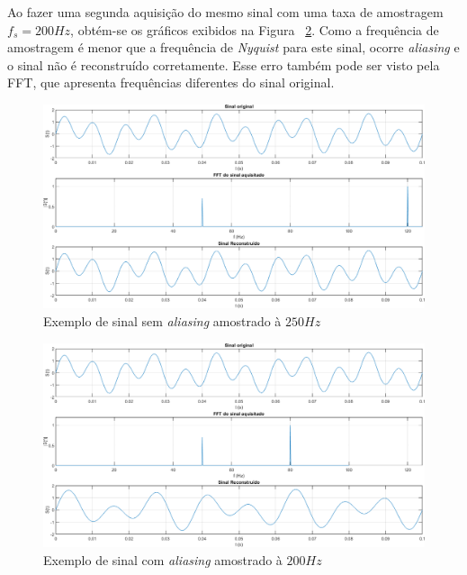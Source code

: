 \documentclass[
	12pt,				%
	openright,			%
	twoside,			%
	a4paper,			%
	english,			%
	french,				%
	spanish,			%
	brazil,				%
	]{abntex2}
\begin{document}
		Ao fazer uma segunda aquisição do mesmo sinal com uma taxa de
		amostragem $f_s = 200Hz$, obtém-se os gráficos exibidos na
		Figura ~\ref{fig:exemploAliasing200}. Como a frequência de amostragem
		é menor que a frequência de \textit{Nyquist} para este sinal, ocorre
		\textit{aliasing} e o sinal não é reconstruído corretamente.
		Esse erro também pode ser visto pela FFT, que apresenta
		frequências diferentes do sinal original.

		\newpage

		\begin{figure}[!ht]
			\centering
			\includegraphics[width=\linewidth]{../Fotos/aliasingFs250.png}
			\caption{Exemplo de sinal sem \textit{aliasing} amostrado à $250Hz$}
			\label{fig:exemploAliasing250}
		\end{figure}

		\begin{figure}[H]
			\centering
			\includegraphics[width=\linewidth]{../Fotos/aliasingFs200.png}
			\caption{Exemplo de sinal com \textit{aliasing} amostrado à $200Hz$}
			\label{fig:exemploAliasing200}
		\end{figure}

		\pagebreak
\end{document}

